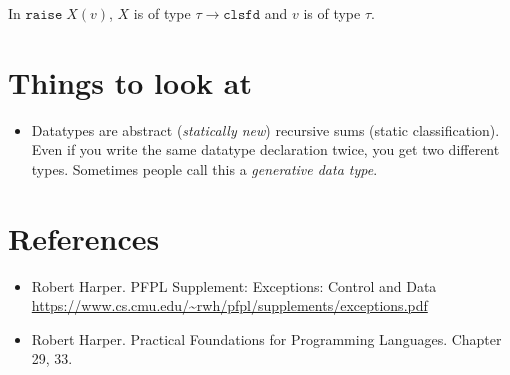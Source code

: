 \documentclass[11pt]{article}
\newcommand{\T}[1]{\ensuremath{\mathtt{#1}}}
\begin{document}
In $\T{raise}\; X(v)$, $X$ is of type $\tau\rightarrow\T{clsfd}$ and $v$
is of type $\tau$.

\section{Things to look at}
\label{sec:look}

\begin{itemize}
\item Datatypes are abstract (\emph{statically new}) recursive sums (static
  classification).  Even if you write the same datatype declaration twice,
  you get two different types.  Sometimes people call this
  a \emph{generative data type}.
\end{itemize}

\section{References}

\begin{itemize}
\item Robert Harper. PFPL Supplement: Exceptions: Control and Data \url{https://www.cs.cmu.edu/~rwh/pfpl/supplements/exceptions.pdf}
\item Robert Harper. Practical Foundations for Programming Languages. Chapter 29, 33.
\end{itemize}
\end{document}
